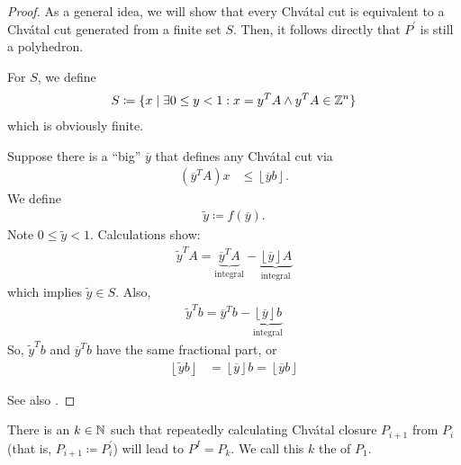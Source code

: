 \begin{proof}
    As a general idea, we will show that every Chv\'atal cut is equivalent to a Chv\'atal cut
    generated from a finite set $S$. Then, it follows directly that $P^\prime$ is still a polyhedron.

    For $S$, we define
    \begin{align*}
        S \coloneqq \{x \mid \exists 0 \leq y < 1: x = y^TA \wedge y^TA \in \mathbb{Z}^n\}
    \end{align*}
    which is obviously finite.

    Suppose there is a \enquote{big} $\overline y$ that defines any Chv\'atal cut via
    \begin{align*}
        (\overline y^T A)x & \leq \left\lfloor \overline yb \right\rfloor.
    \end{align*}
    We define
    \begin{align*}
        \tilde y \coloneqq f(\overline y).
    \end{align*}
    Note $0 \leq \tilde y < 1$. Calculations show:
    \begin{align*}
        \tilde y^TA = \underbrace{\overline y^TA}_{\text{integral}} - \underbrace{\left\lfloor \overline y \right\rfloor A}_{\text{integral}}
    \end{align*}
    which implies $\tilde y \in S$.
    Also,
    \begin{align*}
        \tilde y^Tb = \overline y^Tb - \underbrace{\left\lfloor \overline y \right\rfloor b}_{\text{integral}}
    \end{align*}
    So, $\tilde y^Tb$ and $\overline y^Tb$ have the same fractional part, or
    \begin{align*}
        \left\lfloor \tilde y b\right\rfloor & = \left\lfloor \overline y \right\rfloor b = \left\lfloor \overline y b\right\rfloor
    \end{align*}

    See also \cite[Thm.~6.34]{comb-optimization-cook}.
\end{proof}
\begin{theorem}
    There is an $k \in \mathbb{N} $ such that repeatedly calculating Chv\'atal closure $P_{i+1}$ from $P_i$ (that is, $P_{i+1} \coloneqq P_i^\prime$)
    will lead to $P^I = P_k$. We call this $k$ the  of $P_1$.
\end{theorem}